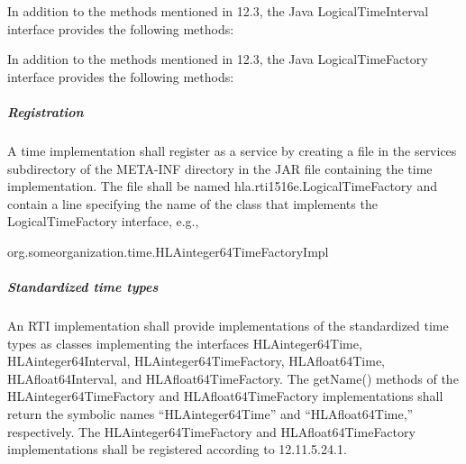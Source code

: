 \begin{compactstdpage}
    In addition to the methods mentioned in 12.3, the Java LogicalTimeInterval interface provides the following methods:

    In addition to the methods mentioned in 12.3, the Java LogicalTimeFactory interface provides the following methods:


    \subparagraph{Registration}

    A time implementation shall register as a service by creating a file in the services subdirectory of the META-INF directory in the JAR file containing the time implementation. The file shall be named hla.rti1516e.LogicalTimeFactory and contain a line specifying the name of the class that implements the LogicalTimeFactory interface, e.g.,

        {\ttfamily\fontsize{8.7}{10}\selectfont org.someorganization.time.HLAinteger64TimeFactoryImpl}

    \subparagraph{Standardized time types}

    An RTI implementation shall provide implementations of the standardized time types as classes implementing the interfaces HLAinteger64Time, HLAinteger64Interval, HLAinteger64TimeFactory, HLAfloat64Time, HLAfloat64Interval, and HLAfloat64TimeFactory. The getName() methods of the HLAinteger64TimeFactory and HLAfloat64TimeFactory implementations shall return the symbolic names ``HLAinteger64Time'' and ``HLAfloat64Time,'' respectively. The HLAinteger64TimeFactory and HLAfloat64TimeFactory implementations shall be registered according to 12.11.5.24.1.


\end{compactstdpage}
